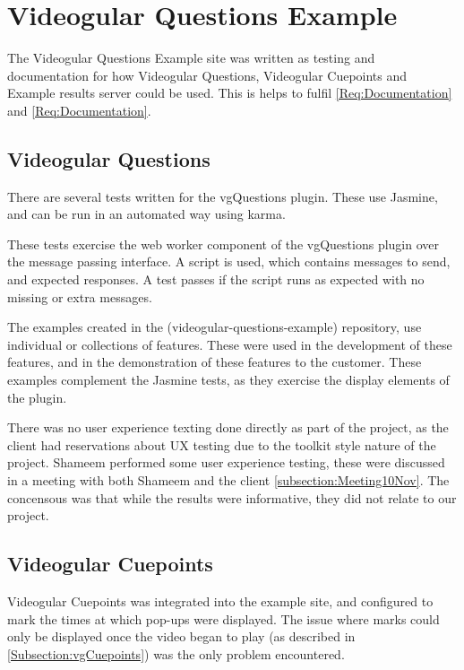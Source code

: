 \section{Videogular Questions Example} 
\label{Section:Videogular Questions Example}

The Videogular Questions Example site was written as testing and documentation for how Videogular Questions, Videogular Cuepoints and Example results server could be used. This is helps to fulfil \cref{Req:Documentation} and \cref{Req:Documentation}.

\subsection{Videogular Questions}
\label{Subsection:Videogular Questions in example}

There are several tests written for the \gls{vgQuestions} plugin. These use Jasmine, and can be run in an automated way using karma.

These tests exercise the web worker component of the \gls{vgQuestions} plugin over the message passing interface. A script is used, which contains messages to send, and expected responses. A test passes if the script runs as expected with no missing or extra messages.

The examples created in the (videogular-questions-example) repository, use individual or collections of features. These were used in the development of these features, and in the demonstration of these features to the customer.  These examples complement the Jasmine tests, as they exercise the display elements of the plugin.

There was no user experience texting done directly as part of the project, as the client had reservations about UX testing due to the toolkit style nature of the project. Shameem performed some user experience testing, these were discussed in a meeting with both Shameem and the client \autoref{subsection:Meeting10Nov}. The concensous was that while the results were informative, they did not relate to our project.

\subsection{Videogular Cuepoints}
\label{Subsection:Videogular Cuepoints in example}
\gls{Videogular} Cuepoints was integrated into the example site, and configured to mark the times at which pop-ups were displayed. The issue where marks could only be displayed once the video began to play (as described in \autoref{Subsection:vgCuepoints}) was the only problem encountered.

